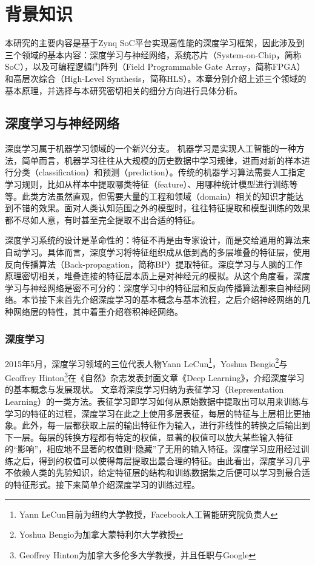 
\chapter{背景知识}\label{sec:req}

本研究的主要内容是基于Zynq SoC平台实现高性能的深度学习框架，因此涉及到三个领域的基本内容：深度学习与神经网络，系统芯片（System-on-Chip，简称SoC），以及可编程逻辑门阵列（Field Programmable Gate Array，简称FPGA）和高层次综合（High-Level Synthesis，简称HLS）。本章分别介绍上述三个领域的基本原理，并选择与本研究密切相关的细分方向进行具体分析。

\section{深度学习与神经网络}

深度学习属于机器学习领域的一个新兴分支。
机器学习是实现人工智能的一种方法，简单而言，机器学习往往从大规模的历史数据中学习规律，进而对新的样本进行分类（classification）和预测（prediction）。传统的机器学习算法需要人工指定学习规则，比如从样本中提取哪类特征（feature）、用哪种统计模型进行训练等等。此类方法虽然直观，但需要大量的工程和领域（domain）相关的知识才能达到不错的效果。面对人类认知范围之外的模型时，往往特征提取和模型训练的效果都不尽如人意，有时甚至完全提取不出合适的特征。

深度学习系统的设计是革命性的：特征不再是由专家设计，而是交给通用的算法来自动学习。具体而言，深度学习将特征组织成从低到高的多层堆叠的特征层，使用反向传播算法（Back-propagation，简称BP）提取特征。深度学习与人脑的工作原理密切相关，堆叠连接的特征层本质上是对神经元的模拟。从这个角度看，深度学习与神经网络是密不可分的：深度学习中的特征层和反向传播算法都来自神经网络。本节接下来首先介绍深度学习的基本概念与基本流程，之后介绍神经网络的几种网络层的特性，其中着重介绍卷积神经网络。

\subsection{深度学习}

2015年5月，深度学习领域的三位代表人物Yann LeCun\footnote{Yann LeCun目前为纽约大学教授，Facebook人工智能研究院负责人}，Yoshua Bengio\footnote{Yoshua Bengio为加拿大蒙特利尔大学教授}与Geoffrey Hinton\footnote{Geoffrey Hinton为加拿大多伦多大学教授，并且任职与Google}在《自然》杂志发表封面文章《Deep Learning》\supercite{lecun2015deep}，介绍深度学习的基本概念与发展现状。
文章将深度学习归纳为表征学习（Representation Learning）\supercite{bengio2013representation}的一类方法。表征学习即学习如何从原始数据中提取出可以用来训练与学习的特征的过程，深度学习在此之上使用多层表征，每层的特征与上层相比更抽象。此外，每一层都获取上层的输出特征作为输入，进行非线性的转换之后输出到下一层。每层的转换方程都有特定的权值，显著的权值可以放大某些输入特征的“影响”，相应地不显著的权值则“隐藏”了无用的输入特征。深度学习应用经过训练之后，得到的权值可以使得每层提取出最合理的特征。由此看出，深度学习几乎不依赖人类的先验知识，给定特征层的结构和训练数据集之后便可以学习到最合适的特征形式。接下来简单介绍深度学习的训练过程。

